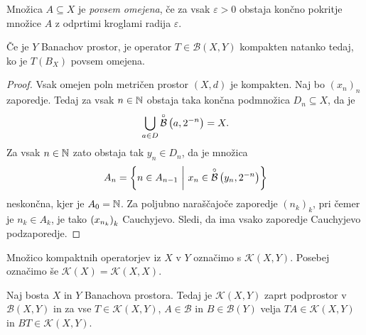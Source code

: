 \begin{definicija}
Množica $A \subseteq X$ je
\emph{povsem omejena}, če za vsak
$\varepsilon > 0$ obstaja končno pokritje množice $A$ z odprtimi
kroglami radija $\varepsilon$.
\end{definicija}

\begin{trditev}
Če je $Y$ Banachov prostor, je operator $T \in \mathcal{B}(X,Y)$
kompakten natanko tedaj, ko je $T(B_X)$ povsem omejena.
\end{trditev}

\begin{proof}
Vsak omejen poln metričen prostor $(X,d)$ je kompakten. Naj bo
$(x_n)_n$ zaporedje. Tedaj za vsak $n \in \mathbb{N}$ obstaja taka končna
podmnožica $D_n \subseteq X$, da je
\[
\bigcup_{a \in D} \overset{\circ}{\mathcal{B}} \left(a,2^{-n}\right) = X.
\]
Za vsak $n \in \mathbb{N}$ zato obstaja tak $y_n \in D_n$, da je množica
\[
A_n = \left\{n \in A_{n-1}~\middle\vert~x_n \in \overset{\circ}{\mathcal{B}} \left(y_n, 2^{-n}\right)\right\}
\]
neskončna, kjer je $A_0 = \mathbb{N}$. Za poljubno naraščajoče zaporedje
$(n_k)_k$, pri čemer je $n_k \in A_k$, je tako $\left(x_{n_k}\right)_k$
Cauchyjevo. Sledi, da ima vsako zaporedje Cauchyjevo podzaporedje.
\end{proof}

\begin{opomba}
Množico kompaktnih operatorjev iz $X$ v $Y$ označimo s
$\mathcal{K}(X,Y)$. Posebej označimo še
$\mathcal{K}(X) = \mathcal{K}(X,X)$.
\end{opomba}

\begin{izrek}
Naj bosta $X$ in $Y$ Banachova prostora. Tedaj je
$\mathcal{K}(X,Y)$ zaprt podprostor v $\mathcal{B}(X,Y)$ in za vse
$T \in \mathcal{K}(X,Y)$, $A \in \mathcal{B}$ in
$B \in \mathcal{B}(Y)$ velja $TA \in \mathcal{K}(X,Y)$ in
$BT \in \mathcal{K}(X,Y)$.
\end{izrek}

